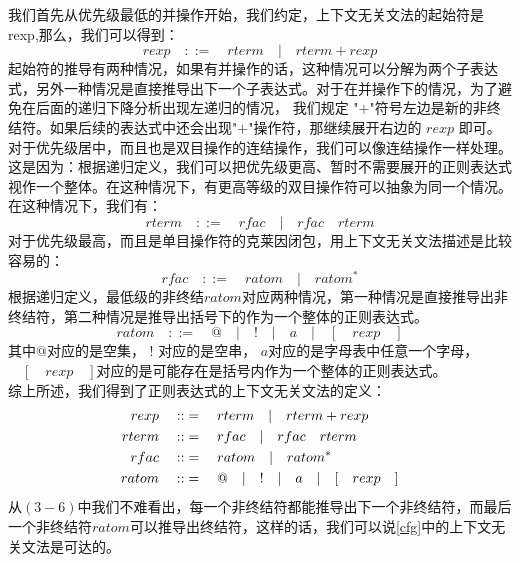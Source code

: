 \documentclass[openany,oneside]{book}
\theoremstyle{definition}
\theoremstyle{definition}
\begin{document}
	我们首先从优先级最低的并操作开始，我们约定，上下文无关文法的起始符是rexp,那么，我们可以得到：
	\begin{equation}
		rexp \quad::=\quad rterm\quad  | \quad rterm + rexp
	\end{equation}
	\indent 起始符的推导有两种情况，如果有并操作的话，这种情况可以分解为两个子表达式，另外一种情况是直接推导出下一个子表达式。对于在并操作下的情况，为了避免在后面的递归下降分析出现左递归的情况， 我们规定 "$+$"符号左边是新的非终结符。如果后续的表达式中还会出现"$+$"操作符，那继续展开右边的 $rexp$ 即可。\\
	\indent 对于优先级居中，而且也是双目操作的连结操作，我们可以像连结操作一样处理。这是因为：根据递归定义，我们可以把优先级更高、暂时不需要展开的正则表达式视作一个整体。在这种情况下，有更高等级的双目操作符可以抽象为同一个情况。在这种情况下，我们有：
	\begin{equation}
		rterm\quad::=\quad rfac\quad | \quad rfac\quad rterm
	\end{equation}
	\indent 对于优先级最高，而且是单目操作符的克莱因闭包，用上下文无关文法描述是比较容易的：
	\begin{equation}
		rfac\quad::=\quad ratom \quad | \quad ratom^* 
	\end{equation}
	\indent 根据递归定义，最低级的非终结$ratom$对应两种情况，第一种情况是直接推导出非终结符，第二种情况是推导出括号下的作为一个整体的正则表达式。
	\begin{equation}
		ratom\quad::=\quad @ \quad | \quad ! \quad |\quad a \quad | \quad[\quad rexp \quad]
	\end{equation}
	\indent 其中$@$对应的是空集， $!$ 对应的是空串， $a$对应的是字母表中任意一个字母， $\quad[\quad rexp \quad]$对应的是可能存在是括号内作为一个整体的正则表达式。 \\
	\indent 综上所述，我们得到了正则表达式的上下文无关文法的定义：
	\begin{equation}\label{cfg}
		\begin{split}
			rexp \quad::&=\quad rterm\quad  | \quad rterm + rexp \hfill  \\
			rterm\quad::&=\quad rfac\quad | \quad rfac\quad rterm \hfill  \\
			rfac\quad::&=\quad ratom \quad | \quad ratom^* \hfill \\
			ratom\quad::&=\quad @ \quad | \quad ! \quad |\quad a \quad | \quad[\quad rexp \quad] \hfill 
		\end{split}
	\end{equation}
	\indent 从\(\left( 3-6\right) \)中我们不难看出，每一个非终结符都能推导出下一个非终结符，而最后一个非终结符$ratom$可以推导出终结符，这样的话，我们可以说\ref{cfg}中的上下文无关文法是可达的。
\end{document}
